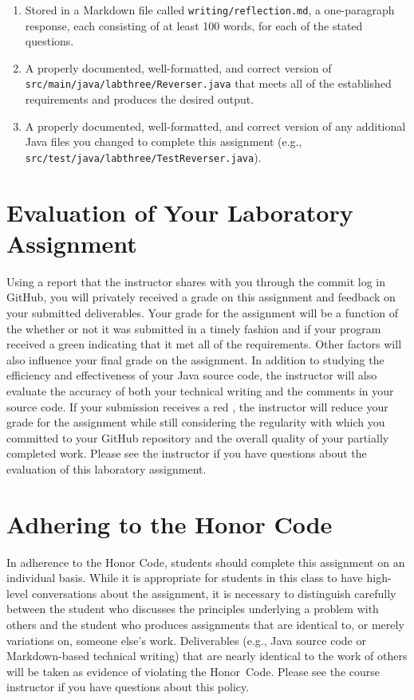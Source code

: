 \documentclass[11pt]{article}
\newcommand{\mainprogramsource}{\lstinline{src/main/java/labthree/Reverser.java}}
\newcommand{\testprogramsource}{\lstinline{src/test/java/labthree/TestReverser.java}}
\newcommand{\reflection}{\lstinline{writing/reflection.md}}
\newcommand{\checkmark}{\ding{51}}
\newcommand{\naughtmark}{\ding{55}}
\begin{document}
\vspace*{-.075in}
\begin{enumerate}

  \setlength{\itemsep}{0in}

\item Stored in a Markdown file called \reflection{}, a one-paragraph response,
  each consisting of at least 100 words, for each of the stated questions.

\item A properly documented, well-formatted, and correct version of
  \mainprogramsource{} that meets all of the established requirements and
  produces the desired output.

\item A properly documented, well-formatted, and correct version of any
  additional Java files you changed to complete this assignment (e.g.,
  \testprogramsource{}).

\end{enumerate}
\vspace*{-.1in}

\section*{Evaluation of Your Laboratory Assignment}

Using a report that the instructor shares with you through the commit log in
GitHub, you will privately received a grade on this assignment and feedback on
your submitted deliverables. Your grade for the assignment will be a function of
the whether or not it was submitted in a timely fashion and if your program
received a green \checkmark{} indicating that it met all of the requirements.
Other factors will also influence your final grade on the assignment. In
addition to studying the efficiency and effectiveness of your Java source code,
the instructor will also evaluate the accuracy of both your technical writing
and the comments in your source code. If your submission receives a red
\naughtmark{}, the instructor will reduce your grade for the assignment while
still considering the regularity with which you committed to your GitHub
repository and the overall quality of your partially completed work. Please see
the instructor if you have questions about the evaluation of this laboratory
assignment.

\section*{Adhering to the Honor Code}

In adherence to the Honor Code, students should complete this assignment on an
individual basis. While it is appropriate for students in this class to have
high-level conversations about the assignment, it is necessary to distinguish
carefully between the student who discusses the principles underlying a problem
with others and the student who produces assignments that are identical to, or
merely variations on, someone else's work. Deliverables (e.g., Java source code
or Markdown-based technical writing) that are nearly identical to the work of
others will be taken as evidence of violating the \mbox{Honor Code}. Please see
the course instructor if you have questions about this policy.
\end{document}
